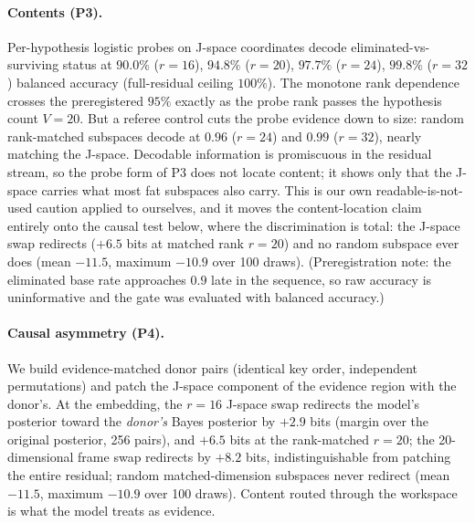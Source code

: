 \documentclass[11pt]{article}
\newcommand{\Jspace}{J\mbox{-}space}
\begin{document}
\paragraph{Contents (P3).} Per-hypothesis logistic probes on \Jspace{}
coordinates decode eliminated-vs-surviving status at $90.0\%$ ($r{=}16$),
$94.8\%$ ($r{=}20$), $97.7\%$ ($r{=}24$), $99.8\%$ ($r{=}32$) balanced
accuracy (full-residual ceiling $100\%$). The monotone rank dependence
crosses the preregistered $95\%$ exactly as the probe rank passes the
hypothesis count $V{=}20$. But a referee control cuts the probe
evidence down to size: random rank-matched subspaces decode at $0.96$
($r{=}24$) and $0.99$ ($r{=}32$), nearly matching the \Jspace{}.
Decodable information is promiscuous in the residual stream, so the
probe form of P3 does not locate content; it shows only that the
\Jspace{} carries what most fat subspaces also carry. This is our own
readable-is-not-used caution applied to ourselves, and it moves the
content-location claim entirely onto the causal test below, where the
discrimination is total: the \Jspace{} swap redirects ($+6.5$ bits at
matched rank $r{=}20$) and no random subspace ever does (mean $-11.5$,
maximum $-10.9$ over 100 draws). (Preregistration note: the eliminated base rate approaches $0.9$ late
in the sequence, so raw accuracy is uninformative and the gate was
evaluated with balanced accuracy.)

\paragraph{Causal asymmetry (P4).} We build evidence-matched donor pairs
(identical key order, independent permutations) and patch the \Jspace{}
component of the evidence region with the donor's. At the embedding, the
$r{=}16$ \Jspace{} swap redirects the model's posterior toward the
\emph{donor's} Bayes posterior by $+2.9$ bits (margin over the original
posterior, 256 pairs), and $+6.5$ bits at the rank-matched $r{=}20$;
the 20-dimensional frame swap redirects by
$+8.2$ bits, indistinguishable from patching the entire residual;
random matched-dimension subspaces never redirect (mean $-11.5$,
maximum $-10.9$ over 100 draws). Content routed
through the workspace is what the model treats as evidence.
\end{document}
